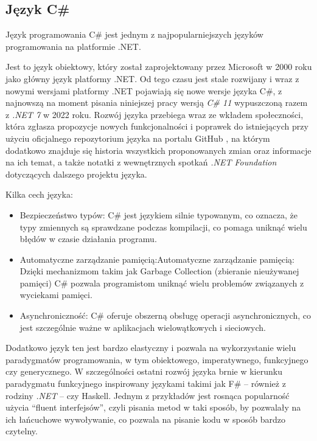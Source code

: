 \subsection{Język C\#}
\label{sec:csharp}

Język programowania C\# jest jednym z najpopularniejszych języków programowania na platformie .NET.

Jest to język obiektowy, który został zaprojektowany przez Microsoft w 2000 roku jako główny język platformy .NET.
Od tego czasu jest stale rozwijany i wraz z nowymi wersjami platformy .NET pojawiają się nowe wersje języka C\#, z najnowszą na moment pisania niniejszej pracy wersją \emph{C\# 11} wypuszczoną razem z \emph{.NET 7} w 2022 roku.
Rozwój języka przebiega wraz ze wkładem społeczności, która zgłasza propozycje nowych funkcjonalności i poprawek do istniejących przy użyciu oficjalnego repozytorium języka na portalu GitHub \cite{dotnet-csharplang-repo}, na którym dodatkowo znajduje się historia wszystkich proponowanych zmian oraz informacje na ich temat, a także notatki z wewnętrznych spotkań \emph{.NET Foundation} dotyczących dalszego projektu języka.

Kilka cech języka:

\begin{itemize}

  \item Bezpieczeństwo typów: C\# jest językiem silnie typowanym, co oznacza, że typy zmiennych są sprawdzane podczas kompilacji, co pomaga uniknąć wielu błędów w czasie działania programu.

  \item Automatyczne zarządzanie pamięcią:Automatyczne zarządzanie pamięcią: Dzięki mechanizmom takim jak Garbage Collection (zbieranie nieużywanej pamięci) C\# pozwala programistom uniknąć wielu problemów związanych z wyciekami pamięci.

  \item Asynchroniczność: C\# oferuje obszerną obsługę operacji asynchronicznych, co jest szczególnie ważne w aplikacjach wielowątkowych i sieciowych.

\end{itemize}

Dodatkowo język ten jest bardzo elastyczny i pozwala na wykorzystanie wielu paradygmatów programowania, w tym obiektowego, imperatywnego, funkcyjnego czy generycznego.
W szczególności ostatni rozwój języka brnie w kierunku paradygmatu funkcyjnego inspirowany językami takimi jak F\# -- również z rodziny \emph{.NET} -- czy Haskell.
Jednym z przykładów jest rosnąca popularność użycia ``fluent interfejsów'', czyli pisania metod w taki sposób, by pozwalały na ich łańcuchowe wywoływanie, co pozwala na pisanie kodu w sposób bardzo czytelny.

